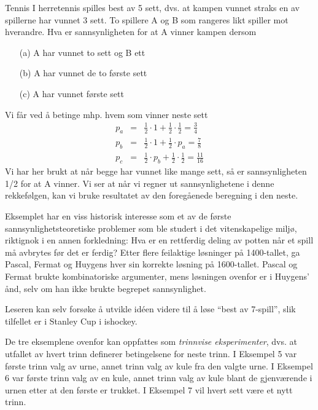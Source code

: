 \begin{eksempel}{Tennis}
I herretennis spilles best av 5 sett, dvs. at kampen vunnet straks en av spillerne
har vunnet 3 sett. To spillere A og B som rangeres likt spiller mot hverandre. 
Hva er sannsynligheten for at A vinner kampen dersom
\begin{itemize}
\item[(a)] A har vunnet to sett og B ett
\item[(b)] A har vunnet de to første sett 
\item[(c)] A har vunnet første sett 
\end{itemize}
Vi får ved å betinge mhp. hvem som vinner neste sett
\begin{eqnarray*}
 p_a  & = & \frac{1}{2} \cdot  1  + \frac{1}{2} \cdot \frac{1}{2}  = \frac{3}{4} \\
 p_b  & = & \frac{1}{2} \cdot  1  + \frac{1}{2} \cdot p_a         = \frac{7}{8} \\ 
 p_c  & = & \frac{1}{2} \cdot p_b + \frac{1}{2} \cdot \frac{1}{2}  = \frac{11}{16} 
\end{eqnarray*}
Vi har her brukt at når begge har vunnet like mange sett,
så er sannsynligheten 1/2 for at A vinner. Vi ser at når vi regner ut
sannsynlighetene i denne rekkefølgen, kan vi bruke resultatet av
den foregåenede beregning i den neste.

Eksemplet har en viss historisk interesse som et av de første
sannsynlighetsteoretiske problemer som ble studert i det vitenskapelige
miljø, riktignok i en annen forkledning: Hva er en rettferdig deling av 
potten når et spill må avbrytes før det er ferdig?
Etter flere feilaktige løsninger på 1400-tallet, ga Pascal, Fermat og 
Huygens hver sin korrekte løsning på 1600-tallet.
Pascal og Fermat brukte kombinatoriske argumenter, mens løsningen 
ovenfor er i Huygens' ånd, selv om han ikke brukte begrepet
sannsynlighet.

Leseren kan selv forsøke å utvikle id\'{e}en videre til å løse
``best av 7-spill'', slik tilfellet er i Stanley Cup i ishockey. 
\end{eksempel}

De tre eksemplene ovenfor kan oppfattes som {\em trinnvise
eksperimenter}, dvs. at utfallet av hvert trinn definerer
betingelsene for neste trinn. I Eksempel 5 var første
trinn valg av urne, annet trinn valg av kule fra den valgte urne.
I Eksempel 6 var første trinn valg av en kule, annet trinn valg
av kule blant de gjenværende i urnen etter at den første er
trukket. I Eksempel 7 vil hvert sett være et nytt trinn.

